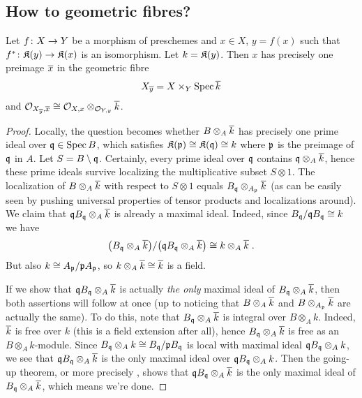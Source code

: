 \documentclass[a4paper,parskip=half,numbers=enddot, DIV=12]{scrreprt}
\begin{document}
\subsection{How to geometric fibres?}
\begin{lem}
	Let $f\colon X\morphism Y$ be a morphism of preschemes and $x\in X$, $y=f(x)$ such that $f^*\colon \KK(y)\morphism\KK(x)$ is an isomorphism. Let $k=\mathfrak{K}(y)$. Then $x$ has precisely one preimage $\overline{x}$ in the geometric fibre
	\begin{align*}
		X_{\overline{y}}=X\times_Y\operatorname{Spec}\overline{k}
	\end{align*}
	and $\mathcal{O}_{X_{\overline{y}},\overline{x}}\cong \mathcal{O}_{X,x}\otimes_{\mathcal{O}_{Y,y}}\overline{k}$. 
\end{lem}
\begin{proof}
	Locally, the question becomes whether $B\otimes_A\overline{k}$ has precisely one prime ideal over $\mathfrak{q}\in\operatorname{Spec} B$, which satisfies $\mathfrak{K}(\mathfrak{p})\cong \mathfrak{K}(\mathfrak{q})\cong k$ where $\mathfrak{p}$ is the preimage of $\mathfrak{q}$ in $A$. Let $S=B\setminus \mathfrak{q}$. Certainly, every prime ideal over $\mathfrak{q}$ contains $\mathfrak{q}\otimes_A\overline{k}$, hence these prime ideals survive localizing the multiplicative subset $S\otimes 1$. The localization of $B\otimes_A\overline{k}$ with respect to $S\otimes 1$ equals $B_{\mathfrak{q}}\otimes_{A_{\mathfrak{p}}}\overline{k}$ (as can be easily seen by pushing universal properties of tensor products and localizations around). We claim that $\mathfrak{q} B_{\mathfrak{q}}\otimes_A\overline{k}$ is already a maximal ideal. Indeed, since $B_{\mathfrak{q}}/\mathfrak{q} B_{\mathfrak{q}}\cong k$ we have
	\begin{align*}
		\big(B_{\mathfrak{q}}\otimes_A\overline{k}\big)/\big(\mathfrak{q} B_{\mathfrak{q}}\otimes_A\overline{k}\big)\cong k\otimes_A\overline{k}\;.
	\end{align*}
	But also $k\cong A_{\mathfrak{p}}/\mathfrak{p} A_{\mathfrak{p}}$, so $k\otimes_A\overline{k}\cong \overline{k}$ is a field.
	
	If we show that $\mathfrak{q} B_{\mathfrak{q}}\otimes_A\overline{k}$ is actually \emph{the only} maximal ideal of $B_{\mathfrak{q}}\otimes_A\overline{k}$, then both assertions will follow at once (up to noticing that $B\otimes_A\overline{k}$ and $B\otimes_{A_{\mathfrak{p}}}\overline{k}$ are actually the same). To do this, note that $B_{\mathfrak{q}}\otimes_A\overline{k}$ is integral over $B\otimes_Ak$. Indeed, $\overline{k}$ is free over $k$ (this is a field extension after all), hence $B_{\mathfrak{q}}\otimes_A\overline{k}$ is free as an $B\otimes_Ak$-module. Since $B_{\mathfrak{q}}\otimes_Ak\cong B_{\mathfrak{q}}/\mathfrak{p} B_{\mathfrak{q}}$ is local with maximal ideal $\mathfrak{q} B_{\mathfrak{q}}\otimes_Ak$, we see that $\mathfrak{q} B_{\mathfrak{q}}\otimes_A\overline{k}$ is the only maximal ideal over $\mathfrak{q} B_{\mathfrak{q}}\otimes_Ak$. Then the going-up theorem, or more precisely \cite[Theorem~7]{alg1}, shows that $\mathfrak{q} B_{\mathfrak{q}}\otimes_A\overline{k}$ is the only maximal ideal of $B_{\mathfrak{q}}\otimes_A\overline{k}$, which means we're done.
\end{proof}
\end{document}

